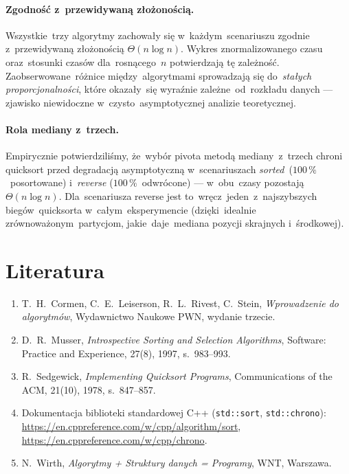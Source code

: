 \documentclass[11pt,a4paper]{article}
\begin{document}
\paragraph{Zgodność z~przewidywaną złożonością.}
Wszystkie~trzy algorytmy zachowały się w~każdym~scenariuszu zgodnie z~przewidywaną złożonością
$\Theta(n\log n)$. Wykres znormalizowanego czasu oraz~stosunki czasów dla~rosnącego~$n$ potwierdzają
tę zależność. Zaobserwowane~różnice między~algorytmami sprowadzają się do~\emph{stałych
proporcjonalności}, które okazały~się wyraźnie zależne~od~rozkładu danych --- zjawisko niewidoczne
w~czysto~asymptotycznej analizie teoretycznej.

\paragraph{Rola mediany z~trzech.}
Empirycznie potwierdziliśmy, że~wybór pivota metodą mediany~z~trzech chroni quicksort przed
degradacją asymptotyczną w~scenariuszach \emph{sorted}~($100\,\%$~posortowane) i~\emph{reverse}
($100\,\%$~odwrócone) --- w~obu~czasy pozostają $\Theta(n\log n)$. Dla~scenariusza reverse jest
to~wręcz~jeden~z~najszybszych biegów~quicksorta w~całym~eksperymencie (dzięki~idealnie
zrównoważonym~partycjom, jakie~daje~mediana pozycji skrajnych i~środkowej).

\section{Literatura}

\begin{enumerate}[nosep]
  \item T.~H.~Cormen, C.~E.~Leiserson, R.~L.~Rivest, C.~Stein, \emph{Wprowadzenie do algorytmów},
  Wydawnictwo Naukowe PWN, wydanie trzecie.
  \item D.~R.~Musser, \emph{Introspective Sorting and Selection Algorithms},
  Software: Practice and Experience, 27(8), 1997, s.~983--993.
  \item R.~Sedgewick, \emph{Implementing Quicksort Programs},
  Communications of the ACM, 21(10), 1978, s.~847--857.
  \item Dokumentacja biblioteki standardowej C++ (\texttt{std::sort}, \texttt{std::chrono}):
  \url{https://en.cppreference.com/w/cpp/algorithm/sort},
  \url{https://en.cppreference.com/w/cpp/chrono}.
  \item N.~Wirth, \emph{Algorytmy + Struktury danych = Programy}, WNT, Warszawa.
\end{enumerate}
\end{document}
